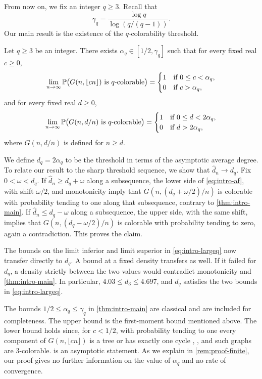 From now on, we fix an integer $q \ge 3$. Recall that
\begin{equation}\label{eq:intro-gamma}
\gamma_q = \frac{\log q}{\log(q/(q - 1))}.
\end{equation}
Our main result is the existence of the $q$-colorability threshold.

\begin{theorem}\label{thm:intro-main}
Let $q \ge 3$ be an integer. There exists $\alpha_q \in [1/2, \gamma_q]$ such that for every fixed real $c \ge 0$,
\[
\lim_{n \to \infty} \mathbb P\bigl(G(n, \lfloor cn \rfloor) \text{ is $q$-colorable}\bigr) =
\begin{cases}
1 & \text{if } 0 \le c < \alpha_q, \\
0 & \text{if } c > \alpha_q,
\end{cases}
\]
and for every fixed real $d \ge 0$,
\[
\lim_{n \to \infty} \mathbb P\bigl(G(n, d/n) \text{ is $q$-colorable}\bigr) =
\begin{cases}
1 & \text{if } 0 \le d < 2\alpha_q, \\
0 & \text{if } d > 2\alpha_q,
\end{cases}
\]
where $G(n, d/n)$ is defined for $n \ge d$.
\end{theorem}

We define $d_q = 2\alpha_q$ to be the threshold in terms of the asymptotic average degree. To relate our result to the sharp threshold sequence, we show that $\hat d_n \to d_q$. Fix $0 < \omega < d_q$. If $\hat d_n \ge d_q + \omega$ along a subsequence, the lower side of \eqref{eq:intro-af}, with shift $\omega/2$, and monotonicity imply that $G(n, (d_q + \omega/2)/n)$ is colorable with probability tending to one along that subsequence, contrary to \cref{thm:intro-main}. If $\hat d_n \le d_q - \omega$ along a subsequence, the upper side, with the same shift, implies that $G(n, (d_q - \omega/2)/n)$ is colorable with probability tending to zero, again a contradiction. This proves the claim.

The bounds on the limit inferior and limit superior in \eqref{eq:intro-largeq} now transfer directly to $d_q$. A bound at a fixed density transfers as well. If it failed for $d_q$, a density strictly between the two values would contradict monotonicity and \cref{thm:intro-main}. In particular, $4.03 \le d_3 \le 4.697$, and $d_q$ satisfies the two bounds in \eqref{eq:intro-largeq}.

The bounds $1/2 \le \alpha_q \le \gamma_q$ in \cref{thm:intro-main} are classical and are included for completeness. The upper bound is the first-moment bound mentioned above. The lower bound holds since, for $c < 1/2$, with probability tending to one every component of $G(n, \lfloor cn \rfloor)$ is a tree or has exactly one cycle \cite{erdos1960evolution}, \cite[Theorem~5.5, p.~112]{janson2000random}, and such graphs are $3$-colorable.  is an asymptotic statement. As we explain in \cref{rem:proof-finite}, our proof gives no further information on the value of $\alpha_q$ and no rate of convergence.

